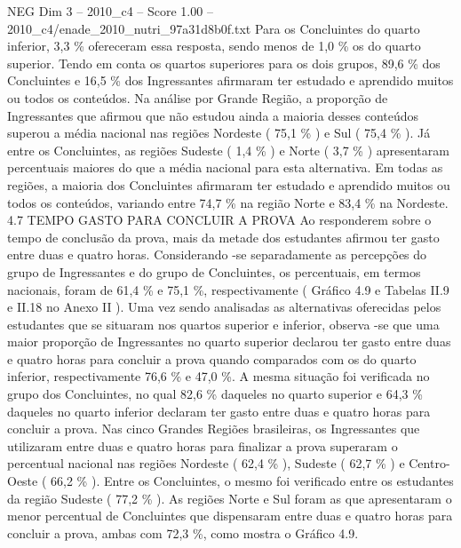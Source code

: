 \begin{textsample}{NEG Dim 3 – 2010\_c4 – Score 1.00 – 2010\_c4/enade\_2010\_nutri\_97a31d8b0f.txt}
Para os Concluintes do quarto inferior, 3,3 \% ofereceram essa resposta, sendo menos de 1,0 \% os do quarto superior.
Tendo em conta os quartos superiores para os dois grupos, 89,6 \% dos Concluintes e 16,5 \% dos Ingressantes afirmaram ter estudado e aprendido muitos ou todos os conteúdos.
Na análise por Grande Região, a proporção de Ingressantes que afirmou que não estudou ainda a maioria desses conteúdos superou a média nacional nas regiões Nordeste ( 75,1 \% ) e Sul ( 75,4 \% ).
Já entre os Concluintes, as regiões Sudeste ( 1,4 \% ) e Norte ( 3,7 \% ) apresentaram percentuais maiores do que a média nacional para esta alternativa.
Em todas as regiões, a maioria dos Concluintes afirmaram ter estudado e aprendido muitos ou todos os conteúdos, variando entre 74,7 \% na região Norte e 83,4 \% na Nordeste. 4.7 TEMPO GASTO PARA CONCLUIR A PROVA Ao responderem sobre o tempo de conclusão da prova, mais da metade dos estudantes afirmou ter gasto entre duas e quatro horas.
Considerando -se separadamente as percepções do grupo de Ingressantes e do grupo de Concluintes, os percentuais, em termos nacionais, foram de 61,4 \% e 75,1 \%, respectivamente ( Gráfico 4.9 e Tabelas II.9 e II.18 no Anexo II ).
Uma vez sendo analisadas as alternativas oferecidas pelos estudantes que se situaram nos quartos superior e inferior, observa -se que uma maior proporção de Ingressantes no quarto superior declarou ter gasto entre duas e quatro horas para concluir a prova quando comparados com os do quarto inferior, respectivamente 76,6 \% e 47,0 \%.
A mesma situação foi verificada no grupo dos Concluintes, no qual 82,6 \% daqueles no quarto superior e 64,3 \% daqueles no quarto inferior declaram ter gasto entre duas e quatro horas para concluir a prova.
Nas cinco Grandes Regiões brasileiras, os Ingressantes que utilizaram entre duas e quatro horas para finalizar a prova superaram o percentual nacional nas regiões Nordeste ( 62,4 \% ), Sudeste ( 62,7 \% ) e Centro-Oeste ( 66,2 \% ).
Entre os Concluintes, o mesmo foi verificado entre os estudantes da região Sudeste ( 77,2 \% ).
As regiões Norte e Sul foram as que apresentaram o menor percentual de Concluintes que dispensaram entre duas e quatro horas para concluir a prova, ambas com 72,3 \%, como mostra o Gráfico 4.9.

\end{textsample}

